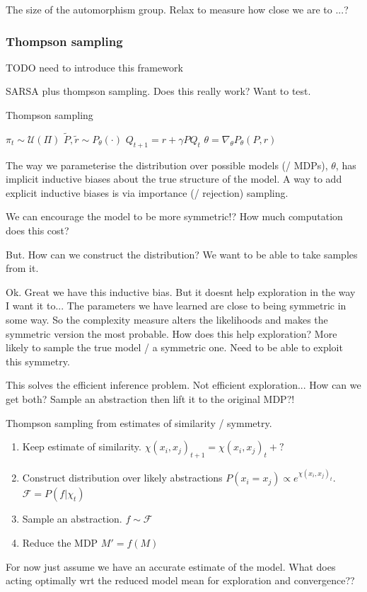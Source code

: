 The size of the automorphism group.
Relax to measure how close we are to ...?


\subsubsection{Thompson sampling} \label{thompson-sampling}

{\color{red}TODO need to introduce this framework}

SARSA plus thompson sampling. Does this really work? Want to test.

\begin{algorithm}
	\caption{Thompson sampling}
	\begin{algorithmic}[1]

		\State $\pi_t \sim \mathcal U(\Pi)$
		\State $\tilde P, \tilde r \sim P_{\theta}(\cdot)$
		\State $Q_{t+1} =  r + \gamma P Q_t$ 
		\State $\theta = \nabla_{\theta} P_{\theta}(P, r)$ 

		\EndWhile
		\State \algorithmicreturn{ $\pi$}
		\EndProcedure

	\end{algorithmic}
\end{algorithm}

The way we parameterise the distribution over possible models (/ MDPs), $\theta$, has implicit inductive biases about the true structure of the model.
A way to add explicit inductive biases is via importance (/ rejection) sampling.

We can encourage the model to be more symmetric!?
How much computation does this cost?

But. How can we construct the distribution? We want to be able to take samples
from it.

Ok. Great we have this inductive bias. But it doesnt help exploration in the way I want it to...
The parameters we have learned are close to being symmetric in some way. So the complexity measure alters the likelihoods and makes the symmetric version the most probable.
How does this help exploration? More likely to sample the true model / a symmetric one. Need to be able to exploit this symmetry.

This solves the efficient inference problem. Not efficient exploration... How can we get both?
Sample an abstraction then lift it to the original MDP?!


Thompson sampling from estimates of similarity / symmetry.
\begin{enumerate}
	\tightlist
	\item Keep estimate of similarity. $\chi(x_i, x_j)_{t+1} = \chi(x_i, x_j)_t + ?$
	\item Construct distribution over likely abstractions $P(x_i = x_j) \propto e^{\chi(x_i, x_j)_t}$. $\mathcal F = P(f|\chi_t)$
	\item Sample an abstraction. $f\sim \mathcal F$
	\item Reduce the MDP $M' = f(M)$
\end{enumerate}


For now just assume we have an accurate estimate of the model.
What does acting optimally wrt the reduced model mean for exploration and convergence??


